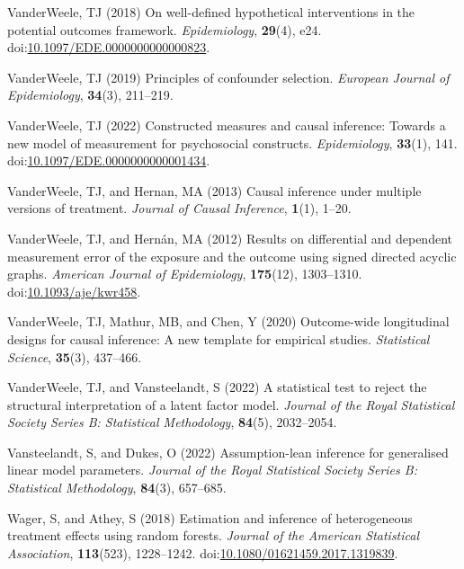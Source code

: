 \documentclass[
  single column]{article}
\newlength{\cslhangindent}
\newenvironment{CSLReferences}[2] %
 {\begin{list}{}{%
  \setlength{\itemindent}{0pt}
  \setlength{\leftmargin}{0pt}
  \setlength{\parsep}{0pt}
  \ifodd #1
   \setlength{\leftmargin}{\cslhangindent}
   \setlength{\itemindent}{-1\cslhangindent}
  \fi
  \setlength{\itemsep}{#2\baselineskip}}}
 {\end{list}}
\begin{document}
\begin{CSLReferences}{1}{0}
VanderWeele, TJ (2018) On well-defined hypothetical interventions in the
potential outcomes framework. \emph{Epidemiology}, \textbf{29}(4), e24.
doi:\href{https://doi.org/10.1097/EDE.0000000000000823}{10.1097/EDE.0000000000000823}.

VanderWeele, TJ (2019) Principles of confounder selection.
\emph{European Journal of Epidemiology}, \textbf{34}(3), 211--219.

VanderWeele, TJ (2022) Constructed measures and causal inference:
Towards a new model of measurement for psychosocial constructs.
\emph{Epidemiology}, \textbf{33}(1), 141.
doi:\href{https://doi.org/10.1097/EDE.0000000000001434}{10.1097/EDE.0000000000001434}.

VanderWeele, TJ, and Hernan, MA (2013) Causal inference under multiple
versions of treatment. \emph{Journal of Causal Inference},
\textbf{1}(1), 1--20.

VanderWeele, TJ, and Hernán, MA (2012) Results on differential and
dependent measurement error of the exposure and the outcome using signed
directed acyclic graphs. \emph{American Journal of Epidemiology},
\textbf{175}(12), 1303--1310.
doi:\href{https://doi.org/10.1093/aje/kwr458}{10.1093/aje/kwr458}.

VanderWeele, TJ, Mathur, MB, and Chen, Y (2020) Outcome-wide
longitudinal designs for causal inference: A new template for empirical
studies. \emph{Statistical Science}, \textbf{35}(3), 437--466.

VanderWeele, TJ, and Vansteelandt, S (2022) A statistical test to reject
the structural interpretation of a latent factor model. \emph{Journal of
the Royal Statistical Society Series B: Statistical Methodology},
\textbf{84}(5), 2032--2054.

Vansteelandt, S, and Dukes, O (2022) Assumption-lean inference for
generalised linear model parameters. \emph{Journal of the Royal
Statistical Society Series B: Statistical Methodology}, \textbf{84}(3),
657--685.

Wager, S, and Athey, S (2018) Estimation and inference of heterogeneous
treatment effects using random forests. \emph{Journal of the American
Statistical Association}, \textbf{113}(523), 1228--1242.
doi:\href{https://doi.org/10.1080/01621459.2017.1319839}{10.1080/01621459.2017.1319839}.


\end{CSLReferences}
\end{document}
